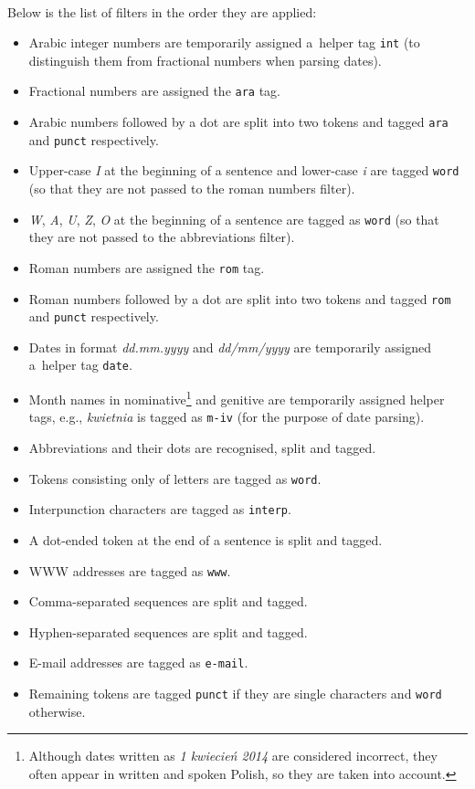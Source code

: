 \documentclass[oneside,12pt]{article}
\begin{document}
\paragraph{}
Below is the list of filters in the order they are applied:
    \begin{itemize}
        \item Arabic integer numbers are temporarily assigned a~helper tag \texttt{int} (to distinguish them from fractional numbers when parsing dates).
        \item Fractional numbers are assigned the \texttt{ara} tag.
        \item Arabic numbers followed by a dot are split into two tokens and tagged \texttt{ara} and \texttt{punct} respectively.
        \item Upper-case \textit{I} at the beginning of a sentence and lower-case \textit{i} are tagged \texttt{word} (so that they are not passed to the roman numbers filter).
        \item \textit{W}, \textit{A}, \textit{U}, \textit{Z}, \textit{O} at the beginning of a sentence are tagged as \texttt{word} (so that they are not passed to the abbreviations filter).
        \item Roman numbers are assigned the \texttt{rom} tag.
        \item Roman numbers followed by a dot are split into two tokens and tagged \texttt{rom} and \texttt{punct} respectively.
        \item Dates in format \textit{dd.mm.yyyy} and \textit{dd/mm/yyyy} are temporarily assigned a~helper tag \texttt{date}.
        \item Month names in nominative\footnote{Although dates written as \textit{1 kwiecień 2014} are considered incorrect, they often appear in written and spoken Polish, so they are taken into account.} and genitive are temporarily assigned helper tags, e.g., \textit{kwietnia} is tagged as \texttt{m-iv} (for the purpose of date parsing).
        \item Abbreviations and their dots are recognised, split and tagged.
        \item Tokens consisting only of letters are tagged as \texttt{word}.
        \item Interpunction characters are tagged as \texttt{interp}.
        \item A dot-ended token at the end of a sentence is split and tagged.
        \item WWW addresses are tagged as \texttt{www}.
        \item Comma-separated sequences are split and tagged.
        \item Hyphen-separated sequences are split and tagged.
        \item E-mail addresses are tagged as \texttt{e-mail}.
        \item Remaining tokens are tagged \texttt{punct} if they are single characters and \texttt{word} otherwise.
    \end{itemize}
\end{document}
